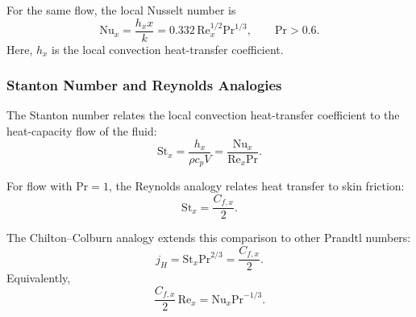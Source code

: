 For the same flow, the local Nusselt number is
\begin{equation*}
  \mathrm{Nu}_x
  = \frac{h_x x}{k}
  = 0.332\,\mathrm{Re}_x^{1/2}\mathrm{Pr}^{1/3},
  \qquad \mathrm{Pr} > 0.6
.\end{equation*}
Here, $h_x$ is the local convection heat-transfer coefficient.

\subsubsection{Stanton Number and Reynolds Analogies}
The Stanton number relates the local convection heat-transfer coefficient
to the heat-capacity flow of the fluid:
\begin{equation*}
  \mathrm{St}_x
  = \frac{h_x}{\rho c_p V}
  = \frac{\mathrm{Nu}_x}{\mathrm{Re}_x\mathrm{Pr}}
.\end{equation*}

For flow with $\mathrm{Pr}=1$, the Reynolds analogy relates heat transfer
to skin friction:
\begin{equation*}
  \mathrm{St}_x = \frac{C_{f,x}}{2}.
\end{equation*}

The Chilton--Colburn analogy extends this comparison to other Prandtl numbers:
\begin{equation*}
  j_H
  = \mathrm{St}_x\mathrm{Pr}^{2/3}
  = \frac{C_{f,x}}{2}.
\end{equation*}
Equivalently,
\begin{equation*}
  \frac{C_{f,x}}{2}\,\mathrm{Re}_x
  = \mathrm{Nu}_x\mathrm{Pr}^{-1/3}.
\end{equation*}
